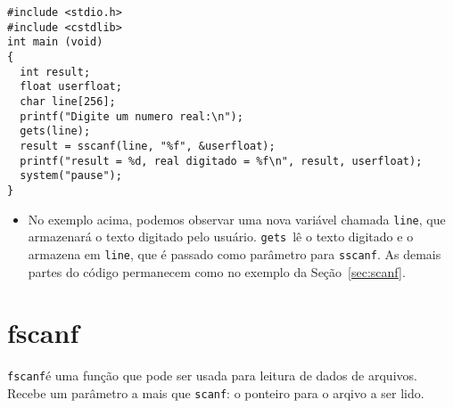 \documentclass{book}
\newcommand{\SCANF}{{\tt scanf}}
\newcommand{\SSCANF}{{\tt sscanf}}
\newcommand{\FSCANF}{{\tt fscanf}}
\newcommand{\GETS}{{\tt gets}}
\begin{document}
\begin{lstlisting}
#include <stdio.h> 
#include <cstdlib> 
int main (void)
{
  int result;
  float userfloat;
  char line[256];
  printf("Digite um numero real:\n");
  gets(line);
  result = sscanf(line, "%f", &userfloat);
  printf("result = %d, real digitado = %f\n", result, userfloat);
  system("pause");
}
\end{lstlisting}

\begin{itemize}

\item No exemplo acima, podemos observar uma nova variável chamada {\tt line}, que armazenará o texto digitado pelo usuário. \GETS\ lê o texto digitado e o armazena em {\tt line}, que é passado como parâmetro para \SSCANF. As demais partes do código permanecem como no exemplo da Seção~\ref{sec:scanf}.

\end{itemize}



\section{fscanf}
\label{sec:fscanf}

\FSCANF é uma função que pode ser usada para leitura de dados de arquivos. Recebe um parâmetro a mais que \SCANF: o ponteiro para o arqivo a ser lido.
\end{document}
